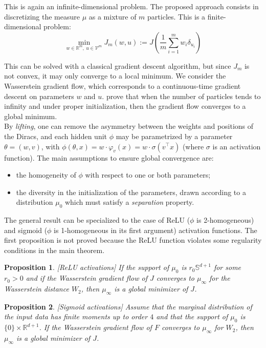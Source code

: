 \documentclass[a4paper, 11pt]{scrartcl}
\newtheorem{proposition}{Proposition}[section]
\begin{document}
{This is again an infinite-dimensional problem. The proposed approach consists in discretizing the measure $\mu$ as a mixture of $m$ particles. This is a finite-dimensional problem:
\begin{equation}
\min_{w \in \mathbb{R}^m,~u \in \mathcal{V}^m} J_m(w, u):=J\left(  \frac{1}{m} \sum_{i=1}^m w_i \delta_{u_i}\right)
\end{equation}

This can be solved with a classical gradient descent algorithm, but since $J_m$ is not convex, it may only converge to a local minimum. We consider the Wasserstein gradient flow, which corresponds to a continuous-time gradient descent on parameters $w$ and $u$. \cite{chizat2018global} prove that when the number of particles tends to infinity and under proper initialization, then the gradient flow converges to a global minimum.\\

By \textit{lifting}, one can remove the asymmetry between the weights and positions of the Diracs, and each hidden unit $\phi$ may be parametrized by a parameter $\theta = (w, v)$, with $\phi(\theta, x)=w \cdot \varphi_v(x) = w\cdot \sigma(v^\top x)$ (where $\sigma$ is an activation function). The main assumptions to ensure global convergence are:
\begin{itemize}
\item the homogeneity of $\phi$ with respect to one or both parameters;
\item the diversity in the initialization of the parameters, drawn according to a distribution $\mu_0$ which must satisfy a \textit{separation} property.\\
\end{itemize}

The general result can be specialized to the case of ReLU ($\phi$ is 2-homogeneous) and sigmoid ($\phi$ is 1-homogeneous in its first argument) activation functions. The first proposition is not proved because the ReLU function violates some regularity conditions in the main theorem.

\begin{proposition}
\emph{[ReLU activations]}
If the support of $\mu_0$ is $r_0 \mathbb{S}^{d+1}$ for some $r_0>0$ and if the Wasserstein gradient flow of $J$ converges to $\mu_\infty$ for the Wasserstein distance $W_2$, then $\mu_\infty$ is a global minimizer of $J$.
\end{proposition}

\begin{proposition}
\emph{[Sigmoid activations]}
Assume that the marginal distribution of the input data has finite moments up to order $4$ and that the support of $\mu_0$ is $\{0\} \times \mathbb{R}^{d+1}$. If the Wasserstein gradient flow of $F$ converges to $\mu_\infty$ for $W_2$, then $\mu_\infty$ is a global minimizer of $J$.
\end{proposition}

}
\end{document}
